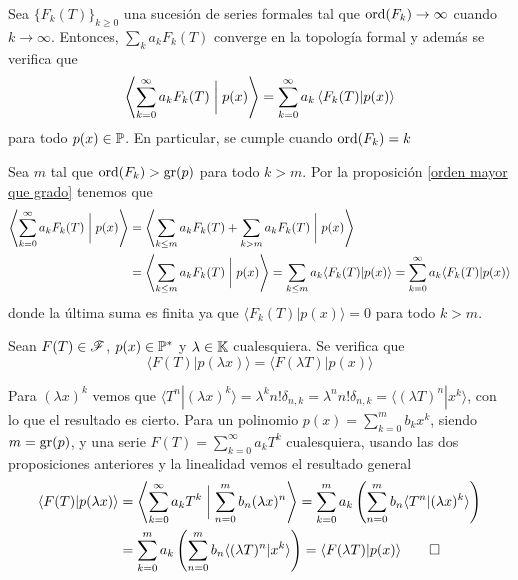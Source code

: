 \begin{proposicion}\label{convergencia intercambio}
    Sea $\{ F_k(T) \}_{k\geq0}$ una sucesión de series formales tal que $\operatorname*{ord}(F_k) \rightarrow \infty$ cuando $k\rightarrow \infty$. Entonces, $\sum_{k}a_kF_k(T)$ converge en la topología formal y además se verifica que
    \begin{equation*}
        \left\langle \sum_{k=0}^\infty a_k F_k(T) \biggm| p(x)\right\rangle = \sum_{k=0}^\infty a_k \left\langle F_k(T)| p(x) \right\rangle
    \end{equation*}
    para todo $p(x) \in \mathbb{P}$. En particular, se cumple cuando $\operatorname*{ord}(F_k) = k$
\end{proposicion}
\begin{demo}
Sea $m$ tal que $\operatorname*{ord}(F_k) > \operatorname{gr}(p)$ para todo $k > m$. Por la proposición \ref{orden mayor que grado} tenemos que
    \begin{align*}
        \left\langle \sum_{k=0}^\infty a_kF_k(T) \biggm| p(x) \right\rangle & = \left\langle \sum_{k \leq m} a_kF_k(T) + \sum_{k > m} a_kF_k(T) \biggm| p(x) \right\rangle \\& = \left\langle \sum_{k \leq m} a_kF_k(T) \biggm| p(x) \right\rangle = \sum_{k \leq m} a_k\langle F_k(T)| p(x)\rangle = \sum_{k=0}^\infty a_k\langle F_k(T)| p(x)\rangle
    \end{align*}
    donde la última suma es finita ya que $\langle F_k(T) | p(x) \rangle = 0$ para todo $k > m$.
\end{demo}

\begin{proposicion}\label{producto escalares}
    Sean $F(T) \in \mathscr{F}$, $p(x) \in \mathbb{P}^*$ y $\lambda \in \mathbb{K}$ cualesquiera. Se verifica que
    \begin{equation*}
        \langle F(T)| p(\lambda x)\rangle = \langle F(\lambda T) | p(x)\rangle
    \end{equation*}
\end{proposicion}
\begin{demo}
    Para $(\lambda x)^k$ vemos que $\langle T^n| (\lambda x)^k \rangle = \lambda^k n! \delta_{n,k} = \lambda^n n! \delta_{n,k} = \langle (\lambda T)^n| x^k\rangle$, con lo que el resultado es cierto. Para un polinomio $p(x) = \sum_{k=0}^m b_k x^k$, siendo $m = \operatorname{gr}(p)$, y una serie $F(T) = \sum_{k = 0}^\infty a_k T^k$ cualesquiera, usando las dos proposiciones anteriores y la linealidad vemos el resultado general
    \begin{align*}
        \langle F(T) | p(\lambda x) \rangle & = \left\langle \sum_{k=0}^\infty a_k T^k \biggm | \sum_{n=0}^{m} b_n (\lambda x)^n \right\rangle = \sum_{k=0}^m a_k\left(\sum_{n=0}^m b_n\langle T^n| (\lambda x)^k\rangle \right) \\
        & = \sum_{k=0}^m a_k\left(\sum_{n=0}^m b_n\langle (\lambda T)^n| x^k\rangle \right) = \langle F(\lambda T) | p(x)\rangle \qedhere
    \end{align*}
\end{demo}

